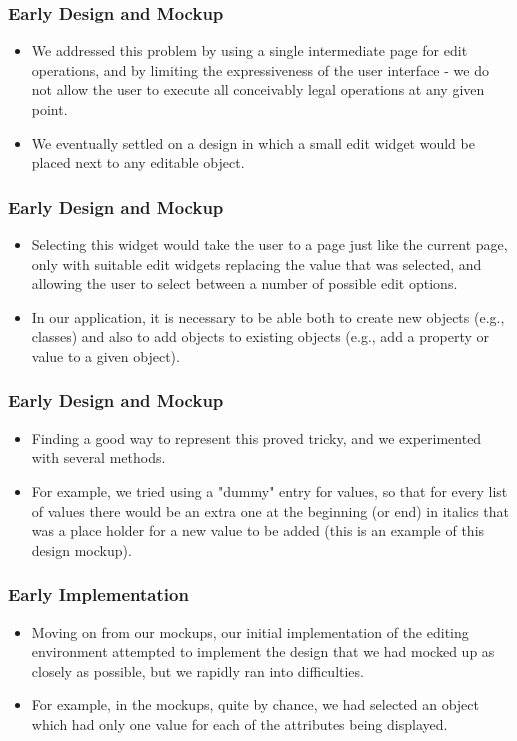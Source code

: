 \documentclass{beamer}
\begin{document}
\begin{frame}
\frametitle{Early Design and Mockup}

\begin{itemize}
\item We addressed this problem by using a single intermediate page for edit operations, and by limiting the expressiveness of the user interface - we do not allow the user to execute all conceivably legal operations at any given point.
\item We eventually settled on a design in which a small edit widget would be placed next to any editable object.
\end{itemize}

\end{frame}

\begin{frame}
\frametitle{Early Design and Mockup}

\begin{itemize}
\item Selecting this widget would take the user to a page just like the current page, only with suitable edit widgets replacing the value that was selected, and allowing the user to select between a number of possible edit options.
\item In our application, it is necessary to be able both to create new objects (e.g., classes) and also to add objects to existing objects (e.g., add a property or value to a given object).
\end{itemize}

\end{frame}

\begin{frame}
\frametitle{Early Design and Mockup}

\begin{itemize}
\item Finding a good way to represent this proved tricky, and we experimented with several methods.
\item For example, we tried using a "dummy" entry for values, so that for every list of values there would be an extra one at the beginning (or end) in italics that was a place holder for a new value to be added (this is an example of this design mockup).
\end{itemize}

\end{frame}

\begin{frame}
\frametitle{Early Implementation}

\begin{itemize}
\item Moving on from our mockups, our initial implementation of the editing environment attempted to implement the design that we had mocked up as closely as possible, but we rapidly ran into difficulties.
\item For example, in the mockups, quite by chance, we had selected an object which had only one value for each of the attributes being displayed.
\end{itemize}

\end{frame}
\end{document}
